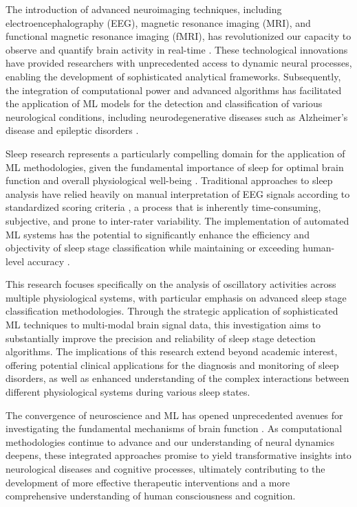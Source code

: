 \documentclass[a4paper,12pt,twoside]{article}
\begin{document}
The introduction of advanced neuroimaging techniques, including electroencephalography (EEG), magnetic resonance imaging (MRI), and functional magnetic resonance imaging (fMRI), has revolutionized our capacity to observe and quantify brain activity in real-time \cite{goldberger2000physiobank}. These technological innovations have provided researchers with unprecedented access to dynamic neural processes, enabling the development of sophisticated analytical frameworks. Subsequently, the integration of computational power and advanced algorithms has facilitated the application of ML models for the detection and classification of various neurological conditions, including neurodegenerative diseases such as Alzheimer's disease and epileptic disorders \cite{frauscher2018atlas}.

Sleep research represents a particularly compelling domain for the application of ML methodologies, given the fundamental importance of sleep for optimal brain function and overall physiological well-being \cite{de2014sleep}. Traditional approaches to sleep analysis have relied heavily on manual interpretation of EEG signals according to standardized scoring criteria \cite{rechtschaffen1968manual, iber2007aasm}, a process that is inherently time-consuming, subjective, and prone to inter-rater variability. The implementation of automated ML systems has the potential to significantly enhance the efficiency and objectivity of sleep stage classification while maintaining or exceeding human-level accuracy \cite{phan2019sleeptransformer}.

This research focuses specifically on the analysis of oscillatory activities across multiple physiological systems, with particular emphasis on advanced sleep stage classification methodologies. Through the strategic application of sophisticated ML techniques to multi-modal brain signal data, this investigation aims to substantially improve the precision and reliability of sleep stage detection algorithms. The implications of this research extend beyond academic interest, offering potential clinical applications for the diagnosis and monitoring of sleep disorders, as well as enhanced understanding of the complex interactions between different physiological systems during various sleep states.

The convergence of neuroscience and ML has opened unprecedented avenues for investigating the fundamental mechanisms of brain function \cite{brunton2016discovering}. As computational methodologies continue to advance and our understanding of neural dynamics deepens, these integrated approaches promise to yield transformative insights into neurological diseases and cognitive processes, ultimately contributing to the development of more effective therapeutic interventions and a more comprehensive understanding of human consciousness and cognition.
\end{document}
